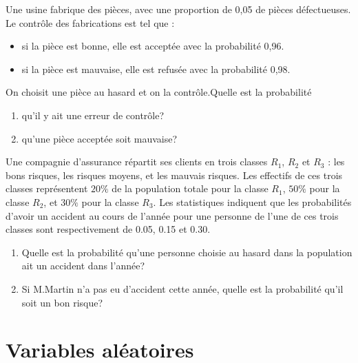 \documentclass{book}
\begin{document}
\begin{Exercice}
Une usine fabrique des pièces, avec une proportion de 0,05 de pièces défectueuses. Le contrôle des 
fabrications est tel que :
\begin{itemize}
\item si la pièce est bonne, elle est acceptée avec la probabilité 0,96.
\item si la pièce est mauvaise, elle est refusée avec la probabilité 0,98.
\end{itemize}
On choisit une pièce au hasard et on la contrôle.Quelle est la probabilité
\begin{enumerate}
\item qu'il y ait une erreur de contrôle?
\item qu'une pièce acceptée soit mauvaise?
\end{enumerate}
\end{Exercice}
\begin{Exercice}
Une compagnie d'assurance répartit ses clients en trois classes $R_1$, $R_2$ et $R_3$ : les bons risques, les risques moyens, et les mauvais risques.
Les effectifs de ces trois classes représentent $20\%$ de la population totale pour la classe $R_1$, $50\%$ pour la classe $R_2$, et 
$30\%$ pour la classe $R_3$. Les statistiques indiquent que les probabilités d'avoir un accident au cours de l'année pour une personne de l'une de ces trois classes sont respectivement de 0.05, 0.15 et 0.30.
\begin{enumerate}
\item Quelle est la probabilité qu'une personne choisie au hasard dans la population ait un accident dans l'année?
\item Si M.Martin n'a pas eu d'accident cette année, quelle est la probabilité qu'il soit un bon risque?
\end{enumerate}
\end{Exercice}
\section*{Variables aléatoires}
\end{document}
